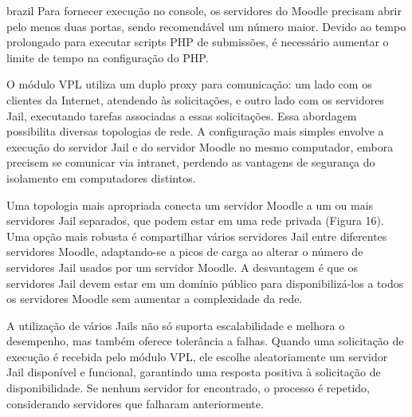 \begin{otherlanguage*}{brazil}
Para fornecer execução no console, os servidores do Moodle precisam abrir pelo menos duas portas, sendo recomendável um número maior. Devido ao tempo prolongado para executar scripts PHP de submissões, é necessário aumentar o limite de tempo na configuração do PHP.

O módulo VPL utiliza um duplo proxy para comunicação: um lado com os clientes da Internet, atendendo às solicitações, e outro lado com os servidores Jail, executando tarefas associadas a essas solicitações. Essa abordagem possibilita diversas topologias de rede. A configuração mais simples envolve a execução do servidor Jail e do servidor Moodle no mesmo computador, embora precisem se comunicar via intranet, perdendo as vantagens de segurança do isolamento em computadores distintos. 

Uma topologia mais apropriada conecta um servidor Moodle a um ou mais servidores Jail separados, que podem estar em uma rede privada (Figura 16). Uma opção mais robusta é compartilhar vários servidores Jail entre diferentes servidores Moodle, adaptando-se a picos de carga ao alterar o número de servidores Jail usados por um servidor Moodle. A desvantagem é que os servidores Jail devem estar em um domínio público para disponibilizá-los a todos os servidores Moodle sem aumentar a complexidade da rede. 

A utilização de vários Jails não só suporta escalabilidade e melhora o desempenho, mas também oferece tolerância a falhas. Quando uma solicitação de execução é recebida pelo módulo VPL, ele escolhe aleatoriamente um servidor Jail disponível e funcional, garantindo uma resposta positiva à solicitação de disponibilidade. Se nenhum servidor for encontrado, o processo é repetido, considerando servidores que falharam anteriormente.


\end{otherlanguage*}
